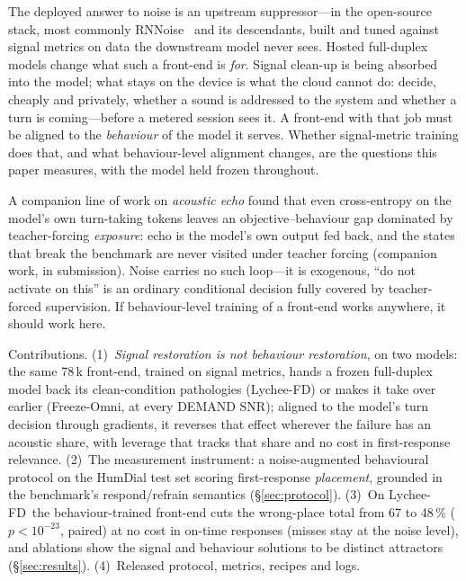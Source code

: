 \documentclass{article}
\newcommand{\lfd}{Lychee-FD}
\begin{document}
The deployed answer to noise is an upstream suppressor---in the open-source stack, most commonly
RNNoise~\cite{valin2018rnnoise} and its descendants, built and tuned against signal metrics on
data the downstream model never sees. Hosted full-duplex models change what such a front-end is
\emph{for}. Signal clean-up is being absorbed into the model; what stays on the device is what
the cloud cannot do: decide, cheaply and privately, whether a sound is addressed to the system
and whether a turn is coming---before a metered session sees it. A front-end with that job must
be aligned to the \emph{behaviour} of the model it serves. Whether signal-metric training does that,
and what behaviour-level alignment changes, are the questions this paper measures, with the model
held frozen throughout.

A companion line of work on \emph{acoustic echo} found that even cross-entropy on the model's own turn-taking tokens leaves an objective--behaviour gap dominated by teacher-forcing \emph{exposure}: echo is the model's own output fed back, and the states that break the benchmark are never visited under teacher forcing (companion work, in submission). Noise carries no such loop---it is exogenous, ``do not activate on this'' is an ordinary conditional decision fully covered by teacher-forced supervision. If behaviour-level training of a front-end works anywhere, it should work here.

Contributions. (1)~\emph{Signal restoration is not behaviour restoration}, on two models: the same 78\,k
front-end, trained on signal metrics, hands a frozen full-duplex model back its clean-condition
pathologies (\lfd) or makes it take over earlier (Freeze-Omni, at every DEMAND SNR); aligned to the
model's turn decision through gradients, it reverses that effect wherever the failure has an acoustic
share, with leverage that tracks that share and no cost in first-response relevance. (2)~The measurement instrument: a
noise-augmented behavioural protocol on the HumDial test set scoring first-response
\emph{placement}, grounded in the benchmark's respond/refrain semantics (\S\ref{sec:protocol}).
(3)~On \lfd\ the behaviour-trained front-end cuts the wrong-place total from 67 to 48\,\%
($p<10^{-23}$, paired) at no cost in on-time responses (misses stay at the noise level), and ablations show the signal and behaviour
solutions to be distinct attractors (\S\ref{sec:results}). (4)~Released protocol, metrics, recipes and logs.
\end{document}
